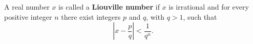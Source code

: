 A real number $x$ is called a \textbf{Liouville number} if $x$ is irrational and for every positive integer $n$ there exist integers $p$ and $q$, with $q > 1$, such that
$$\left| x - \frac{p}{q} \right| < \frac{1}{q^n}.$$
